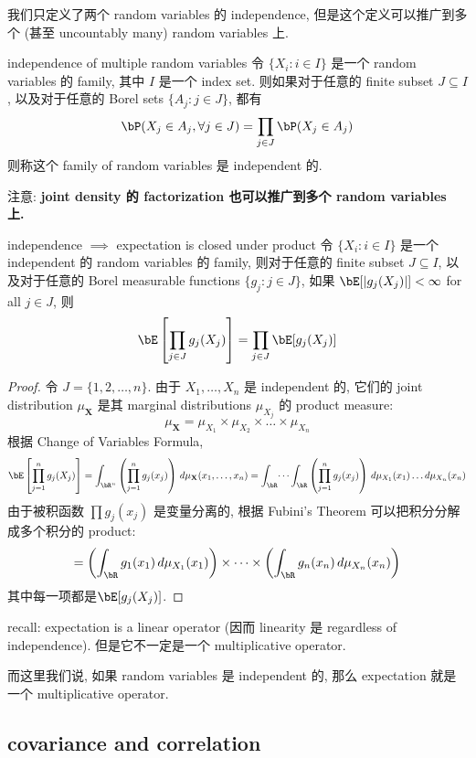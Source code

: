 我们只定义了两个 random variables 的 independence, 
但是这个定义可以推广到多个 (甚至 uncountably many) random variables 上.
\begin{definition}{independence of multiple random variables}
    令 \(\{X_i: i \in I\}\) 是一个 random variables 的 family, 
    其中 \(I\) 是一个 index set. 
    则如果对于任意的 finite subset \(J \subseteq I\), 
    以及对于任意的 Borel sets \(\{A_j: j \in J\}\), 都有
    \[
    \bP(X_j \in A_j, \forall j \in J) = \prod_{j\in J} \bP(X_j \in A_j)
    \]
    则称这个 family of random variables 是 independent 的.
\end{definition}
注意: \textbf{joint density 的 factorization 也可以推广到多个 random variables 上.}
\begin{proposition}{independence \(\implies\) expectation is closed under product}
    令 \(\{X_i: i \in I\}\) 是一个 independent 的 random variables 的 family, 
    则对于任意的 finite subset \(J \subseteq I\), 以及对于任意的 Borel measurable functions \(\{g_j: j \in J\}\), 
    如果 \(\bE[|g_j(X_j)|] < \infty\) for all \(j \in J\), 则
    \[
    \bE\left[\prod_{j\in J} g_j(X_j)\right] = \prod_{j\in J} \bE[g_j(X_j)]
    \]
\end{proposition}
\begin{proof}
令 $J = \{1, 2, \dots, n\}$.
由于 $X_1, \dots, X_n$ 是 independent 的, 它们的 joint distribution
 $\mu_{\mathbf{X}}$ 是其 marginal distributions $\mu_{X_j}$ 的 product measure: $$\mu_{\mathbf{X}} = \mu_{X_1} \times \mu_{X_2} \times \dots \times \mu_{X_n}$$
根据 Change of Variables Formula, 
$$\bE\left[\prod_{j=1}^n g_j(X_j)\right] = \int_{\bR^n} 
\left( \prod_{j=1}^n g_j(x_j) \right) \, d\mu_{\mathbf{X}}(x_1, \dots, x_n)
= \int_{\bR} \dots \int_{\bR} \left( \prod_{j=1}^n g_j(x_j) \right) \, d\mu_{X_1}(x_1) \dots d\mu_{X_n}(x_n)
$$
由于被积函数 $\prod g_j(x_j)$ 是变量分离的, 根据 Fubini's Theorem 可以把积分分解成多个积分的 product:
$$= \left( \int_{\bR} g_1(x_1) \, d\mu_{X_1}(x_1) \right) \times \dots \times \left( \int_{\bR} g_n(x_n) \, d\mu_{X_n}(x_n) \right)$$
其中每一项都是$\bE[g_j(X_j)]$.
\end{proof}
\begin{remark}
recall: expectation is a linear operator (因而 linearity 是 regardless of independence).
但是它不一定是一个 multiplicative operator. 

而这里我们说, 如果 random variables 是 independent 的, 那么 expectation 就是一个 multiplicative operator.
\end{remark}


\subsection{covariance and correlation}


